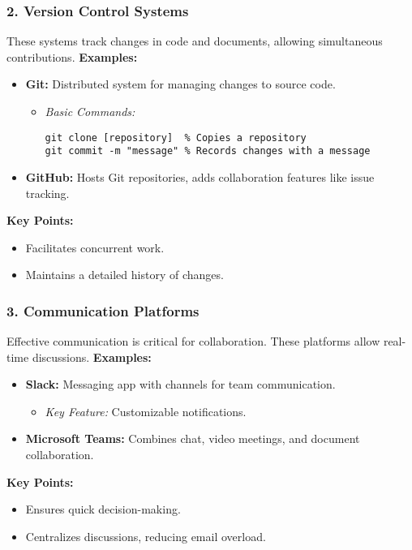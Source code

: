 \documentclass[aspectratio=169]{beamer}
\begin{document}
\begin{frame}[fragile]
    \frametitle{2. Version Control Systems}
    These systems track changes in code and documents, allowing simultaneous contributions.
    \textbf{Examples:}
    \begin{itemize}
        \item \textbf{Git:} Distributed system for managing changes to source code.
        \begin{itemize}
            \item \textit{Basic Commands:}
            \begin{lstlisting}
git clone [repository]  % Copies a repository
git commit -m "message" % Records changes with a message
            \end{lstlisting}
        \end{itemize}
        \item \textbf{GitHub:} Hosts Git repositories, adds collaboration features like issue tracking.
    \end{itemize}
    \textbf{Key Points:}
    \begin{itemize}
        \item Facilitates concurrent work.
        \item Maintains a detailed history of changes.
    \end{itemize}
\end{frame}

\begin{frame}[fragile]
    \frametitle{3. Communication Platforms}
    Effective communication is critical for collaboration. These platforms allow real-time discussions.
    \textbf{Examples:}
    \begin{itemize}
        \item \textbf{Slack:} Messaging app with channels for team communication.
        \begin{itemize}
            \item \textit{Key Feature:} Customizable notifications.
        \end{itemize}
        \item \textbf{Microsoft Teams:} Combines chat, video meetings, and document collaboration.
    \end{itemize}
    \textbf{Key Points:}
    \begin{itemize}
        \item Ensures quick decision-making.
        \item Centralizes discussions, reducing email overload.
    \end{itemize}
\end{frame}
\end{document}
